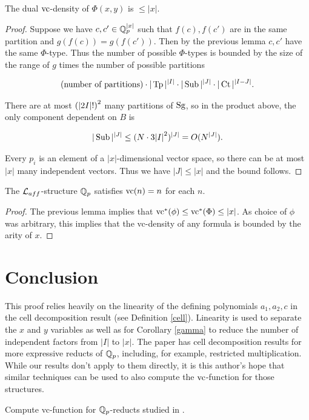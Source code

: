 \documentclass{amsart}
\begin{document}
\begin{Corollary}
  The dual $\operatorname{vc}$-density of $\Phi(x,y)$ is $\leq |x|$.
\end{Corollary}

\begin{proof}
  Suppose we have $c, c' \in \mathbb{Q}_p^{|x|}$ such that $f(c), f(c')$ are in the same partition and $g(f(c)) = g(f(c'))$.
  Then by the previous lemma $c, c'$ have the same $\Phi$-type.
  Thus the number of possible $\Phi$-types is bounded by the size of the range of $g$ times the number of possible partitions
  
  \begin{align*}
    \text{(number of partitions)} \cdot |\operatorname{Tp}|^{|I|} \cdot |\operatorname{Sub}|^{|J|} \cdot |\operatorname{Ct}|^{|I-J|}.
  \end{align*}

  There are at most $\left(|2I|!\right)^2$ many partitions of $\operatorname{Sg}$,
  so in the product above, the only component dependent on $B$ is

  \begin{align*}
    |\operatorname{Sub}|^{|J|} \leq (N \cdot 3{|I|}^2)^{|J|} = O(N^{|J|}).
  \end{align*}	
  
  Every $p_i$ is an element of a $|x|$-dimensional vector space, so there can be at most $|x|$ many independent vectors.
  Thus we have $|J| \leq |x|$ and the bound follows.
\end{proof}

\begin{Corollary} 
  The $\mathcal L_{aff}$-structure $\mathbb{Q}_p$ satisfies $\operatorname{vc}(n) = n$ for each $n$.
\end{Corollary}

\begin{proof}
  The previous lemma implies that $\operatorname{vc}^*(\phi) \leq \operatorname{vc}^*(\Phi) \leq |x|$.
  As choice of $\phi$ was arbitrary, this implies that the vc-density of any formula is bounded by the arity of $x$.
\end{proof}

\section{Conclusion}
This proof relies heavily on the linearity of the defining polynomials $a_1, a_2, c$ in the cell decomposition result (see Definition \ref{cell}).
Linearity is used to separate the $x$ and $y$ variables as well as
for Corollary \ref{gamma} to reduce the number of independent factors from $|I|$ to $|x|$.
The paper \cite{reduct} has cell decomposition results for more expressive reducts of $\mathbb{Q}_p$,
including, for example, restricted multiplication.
While our results don't apply to them directly,
it is this author's hope that similar techniques can be used to also compute the $\operatorname{vc}$-function for those structures.
\begin{openq}
  Compute vc-function for $\mathbb{Q}_p$-reducts studied in \cite{reduct}.
\end{openq}
\end{document}
